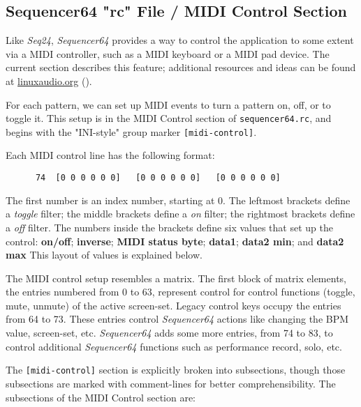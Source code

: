 \subsection{Sequencer64 "rc" File / MIDI Control Section}
\label{subsec:seq64_rc_file_midi_control}

   Like \textsl{Seq24}, \textsl{Sequencer64} provides a way to control the
   application to some extent via a MIDI controller, such as a MIDI keyboard or
   a MIDI pad device.  The current section describes this feature;
   additional resources and ideas can be found at \url{linuxaudio.org}
   (\cite{midicontrol}).

   For each pattern, we can set up MIDI events to turn a 
   pattern on, off, or to toggle it.  This setup is in the 
   MIDI Control section of \texttt{sequencer64.rc}, and begins with the
   "INI-style" group marker \texttt{[midi-control]}.

   Each MIDI control line has the following format:

   \begin{verbatim}
      74  [0 0 0 0 0 0]   [0 0 0 0 0 0]   [0 0 0 0 0 0]
   \end{verbatim}

   The first number is an index number, starting at 0.
   The leftmost brackets define a \textsl{toggle} filter;
   the middle brackets define a \textsl{on} filter;
   the rightmost brackets define a \textsl{off} filter.
   The numbers inside the brackets define six values that set up the control:
   \textbf{on/off}; \textbf{inverse}; \textbf{MIDI status byte};
   \textbf{data1}; \textbf{data2 min}; and \textbf{data2 max}
   This layout of values is explained below.

   The MIDI control setup resembles a matrix.
   The first block of matrix elements, the entries numbered from 0 to 63,
   represent control for control functions (toggle, mute, unmute)
   of the active screen-set.
   Legacy control keys occupy the entries from 64 to 73.  These entries control
   \textsl{Sequencer64} actions like changing the BPM value, screen-set, etc.
   \textsl{Sequencer64} adds some more entries, from 74 to 83, to control
   additional \textsl{Sequencer64} functions such as performance
   record, solo, etc.
   
   The \texttt{[midi-control]}
   section is explicitly broken into subsections, though those
   subsections are marked with comment-lines for better comprehensibility.  The
   subsections of the MIDI Control section are:

